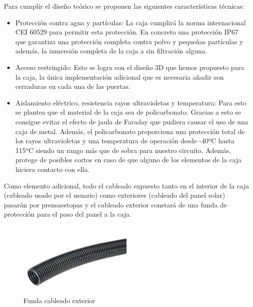 Para cumplir el diseño teórico se proponen las siguientes características técnicas:
\begin{itemize}
    \item Protección contra agua y partículas: La caja cumplirá la norma internacional CEI 60529 para permitir esta protección. En concreto una protección IP67 que garantiza una protección completa contra polvo y pequeñas partículas y además, la inmersión completa de la caja a sin filtración alguna. 

    \item Acceso restringido: Esto se logra con el diseño 3D que hemos propuesto para la caja, la única implementación adicional que es necesaria añadir son cerraduras en cada una de las puertas.

    \item Aislamiento eléctrico, resistencia rayos ultravioletas y temperatura: Para esto se plantea que el material de la caja sea de policarbonato. Gracias a esto se consigue evitar el efecto de jaula de Faraday que pudiera causar el uso de una caja de metal. Además, el policarbonato proporciona una protección total de los rayos ultravioletas y una temperatura de operación desde -40ºC hasta 115ºC siendo un rango más que de sobra para nuestro circuito.  %
    Además, protege de posibles cortos en caso de que alguno de los elementos de la caja hiciera contacto con ella.
\end{itemize}

Como elemento adicional, todo el cableado expuesto tanto en el interior de la caja (cableado usado por el usuario) como exteriores (cableado del panel solar) pasarán por prensaestopas y el cableado exterior constará de una funda de protección para el paso del panel a la caja.
\begin{figure}[H]
    \centering
    \includegraphics[width=0.5\textwidth]{images/4-DesarrolloTeorico/4-1-caja/CAJA_FUNDAS.png}
    \caption{Funda cableado exterior}
    \label{fig:DesarrolloTeorico/Caja/CAJA_FUNDA}
\end{figure}

